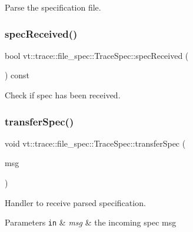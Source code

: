 Parse the specification file. 

\mbox{\label{structvt_1_1trace_1_1file__spec_1_1_trace_spec_aba7577d831109f8459e5378db392e717}} 
\subsubsection{\texorpdfstring{spec\+Received()}{specReceived()}}
{\footnotesize\ttfamily bool vt\+::trace\+::file\+\_\+spec\+::\+Trace\+Spec\+::spec\+Received (\begin{DoxyParamCaption}{ }\end{DoxyParamCaption}) const\hspace{0.3cm}{\ttfamily [inline]}}



Check if spec has been received. 

\mbox{\label{structvt_1_1trace_1_1file__spec_1_1_trace_spec_a4b3dca3408cbcc932fa55b87f086a42b}} 
\subsubsection{\texorpdfstring{transfer\+Spec()}{transferSpec()}}
{\footnotesize\ttfamily void vt\+::trace\+::file\+\_\+spec\+::\+Trace\+Spec\+::transfer\+Spec (\begin{DoxyParamCaption}\item[{\hyperlink{structvt_1_1trace_1_1file__spec_1_1_trace_spec_1_1_spec_msg}{Spec\+Msg} $\ast$}]{msg }\end{DoxyParamCaption})\hspace{0.3cm}{\ttfamily [private]}}



Handler to receive parsed specification. 


\begin{DoxyParams}[1]{Parameters}
\mbox{\tt in}  & {\em msg} & the incoming spec msg \\
\hline
\end{DoxyParams}


